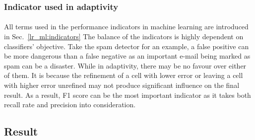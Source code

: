 \subsubsection{Indicator used in adaptivity}
\paragraph{}
All terms used in the performance indicators in machine learning are introduced in Sec.~\ref{lr_ml:indicators}
The balance of the indicators is highly dependent on classifiers' objective.
Take the spam detector for an example, a false positive can be more dangerous than a false negative as an important e-mail being marked as spam can be a disaster.
While in adaptivity, there may be no favour over either of them.
It is because the refinement of a cell with lower error or leaving a cell with higher error unrefined may not produce significant influence on the final result.
As a result, F1 score can be the most important indicator as it takes both recall rate and precision into consideration.


\subsection{Result}
